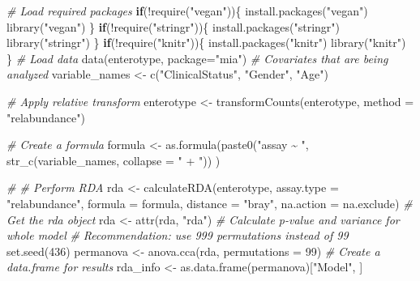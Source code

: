 \documentclass[
]{book}
\newenvironment{Shaded}{\begin{snugshade}}{\end{snugshade}}
\newcommand{\AttributeTok}[1]{\textcolor[rgb]{0.77,0.63,0.00}{#1}}
\newcommand{\CommentTok}[1]{\textcolor[rgb]{0.56,0.35,0.01}{\textit{#1}}}
\newcommand{\ControlFlowTok}[1]{\textcolor[rgb]{0.13,0.29,0.53}{\textbf{#1}}}
\newcommand{\DecValTok}[1]{\textcolor[rgb]{0.00,0.00,0.81}{#1}}
\newcommand{\FunctionTok}[1]{\textcolor[rgb]{0.00,0.00,0.00}{#1}}
\newcommand{\NormalTok}[1]{#1}
\newcommand{\OtherTok}[1]{\textcolor[rgb]{0.56,0.35,0.01}{#1}}
\newcommand{\SpecialCharTok}[1]{\textcolor[rgb]{0.00,0.00,0.00}{#1}}
\newcommand{\StringTok}[1]{\textcolor[rgb]{0.31,0.60,0.02}{#1}}
\begin{document}
\begin{Shaded}
\begin{Highlighting}[]
\CommentTok{\# Load required packages}
\ControlFlowTok{if}\NormalTok{(}\SpecialCharTok{!}\FunctionTok{require}\NormalTok{(}\StringTok{"vegan"}\NormalTok{))\{}
    \FunctionTok{install.packages}\NormalTok{(}\StringTok{"vegan"}\NormalTok{)}
    \FunctionTok{library}\NormalTok{(}\StringTok{"vegan"}\NormalTok{)}
\NormalTok{\}}
\ControlFlowTok{if}\NormalTok{(}\SpecialCharTok{!}\FunctionTok{require}\NormalTok{(}\StringTok{"stringr"}\NormalTok{))\{}
    \FunctionTok{install.packages}\NormalTok{(}\StringTok{"stringr"}\NormalTok{)}
    \FunctionTok{library}\NormalTok{(}\StringTok{"stringr"}\NormalTok{)}
\NormalTok{\}}
\ControlFlowTok{if}\NormalTok{(}\SpecialCharTok{!}\FunctionTok{require}\NormalTok{(}\StringTok{"knitr"}\NormalTok{))\{}
    \FunctionTok{install.packages}\NormalTok{(}\StringTok{"knitr"}\NormalTok{)}
    \FunctionTok{library}\NormalTok{(}\StringTok{"knitr"}\NormalTok{)}
\NormalTok{\}}
\CommentTok{\# Load data}
\FunctionTok{data}\NormalTok{(enterotype, }\AttributeTok{package=}\StringTok{"mia"}\NormalTok{)}
\CommentTok{\# Covariates that are being analyzed}
\NormalTok{variable\_names }\OtherTok{\textless{}{-}} \FunctionTok{c}\NormalTok{(}\StringTok{"ClinicalStatus"}\NormalTok{, }\StringTok{"Gender"}\NormalTok{, }\StringTok{"Age"}\NormalTok{)}

\CommentTok{\# Apply relative transform}
\NormalTok{enterotype }\OtherTok{\textless{}{-}} \FunctionTok{transformCounts}\NormalTok{(enterotype, }\AttributeTok{method =} \StringTok{"relabundance"}\NormalTok{)}

\CommentTok{\# Create a formula}
\NormalTok{formula }\OtherTok{\textless{}{-}} \FunctionTok{as.formula}\NormalTok{(}\FunctionTok{paste0}\NormalTok{(}\StringTok{"assay \textasciitilde{} "}\NormalTok{, }\FunctionTok{str\_c}\NormalTok{(variable\_names, }\AttributeTok{collapse =} \StringTok{" + "}\NormalTok{)) )}

\CommentTok{\# \# Perform RDA}
\NormalTok{rda }\OtherTok{\textless{}{-}} \FunctionTok{calculateRDA}\NormalTok{(enterotype, }\AttributeTok{assay.type =} \StringTok{"relabundance"}\NormalTok{,}
                    \AttributeTok{formula =}\NormalTok{ formula, }\AttributeTok{distance =} \StringTok{"bray"}\NormalTok{, }\AttributeTok{na.action =}\NormalTok{ na.exclude)}
\CommentTok{\# Get the rda object}
\NormalTok{rda }\OtherTok{\textless{}{-}} \FunctionTok{attr}\NormalTok{(rda, }\StringTok{"rda"}\NormalTok{)}
\CommentTok{\# Calculate p{-}value and variance for whole model}
\CommentTok{\# Recommendation: use 999 permutations instead of 99}
\FunctionTok{set.seed}\NormalTok{(}\DecValTok{436}\NormalTok{)}
\NormalTok{permanova }\OtherTok{\textless{}{-}} \FunctionTok{anova.cca}\NormalTok{(rda, }\AttributeTok{permutations =} \DecValTok{99}\NormalTok{)}
\CommentTok{\# Create a data.frame for results}
\NormalTok{rda\_info }\OtherTok{\textless{}{-}} \FunctionTok{as.data.frame}\NormalTok{(permanova)[}\StringTok{"Model"}\NormalTok{, ]}


\end{Highlighting}
\end{Shaded}
\end{document}
